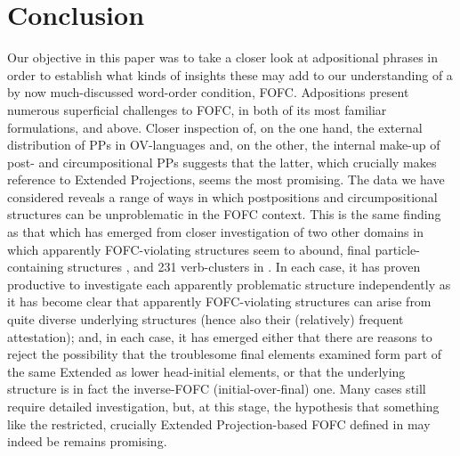 \documentclass[output=paper]{LSP/langsci}
\begin{document}
\section{Conclusion}\label{sec:biberauer:5}

Our objective in this paper was to take a closer look at adpositional phrases in order to establish what kinds of insights these may add to our understanding of a by now much-discussed word-order condition, FOFC. Adpositions present numerous superficial challenges to FOFC, in both of its most familiar formulations,  and  above. Closer inspection of, on the one hand, the external distribution of PPs in OV-languages and, on the other, the internal make-up of post- and circumpositional PPs suggests that the latter, which crucially makes reference to Extended Projections, seems the most promising. The data we have considered reveals a range of ways in which postpositions and circumpositional structures can be unproblematic in the FOFC context. This is the same finding as that which has emerged from closer investigation of two other domains in which apparently FOFC-violating structures seem to abound, final particle-containing structures \citep{Biberauer2017optionalv2}, and 231 verb-clusters in  \citep{Biberauer2013}. In each case, it has proven productive to investigate each apparently problematic structure independently as it has become clear that apparently FOFC-violating structures can arise from quite diverse underlying structures (hence also their (relatively) frequent attestation); and, in each case, it has emerged either that there are reasons to reject the possibility that the troublesome final elements examined form part of the same Extended  as lower head-initial elements, or that the underlying structure is in fact the inverse-FOFC (initial-over-final) one. Many cases still require detailed investigation, but, at this stage, the hypothesis that something like the restricted, crucially Extended Projection-based FOFC defined in  may indeed be  remains promising. 
\end{document}
